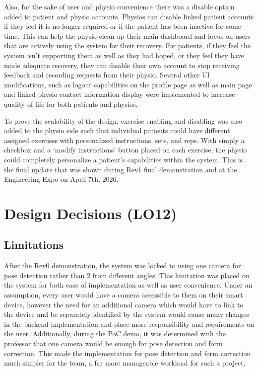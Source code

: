\documentclass{article}
\begin{document}
Also, for the sake of user and physio convenience there was a disable option added to patient and physio accounts. Physios can disable linked patient accounts if they feel it is no longer required or if the patient has been inactive for some time. This can help the physio clean up their main dashboard and focus on users that are actively using the system for their recovery. For patients, if they feel the system isn’t supporting them as well as they had hoped, or they feel they have made adequate recovery, they can disable their own account to stop receiving feedback and recording requests from their physio. Several other UI modifications, such as logout capabilities on the profile page as well as main page and linked physio contact information display were implemented to increase quality of life for both patients and physios.

To prove the scalability of the design, exercise enabling and disabling was also added to the physio side such that individual patients could have different assigned exercises with personalized instructions, sets, and reps. With simply a checkbox and a ‘modify instructions’ button placed on each exercise, the physio could completely personalize a patient’s capabilities within the system. This is the final update that was shown during Rev1 final demonstration and at the Engineering Expo on April 7th, 2026.

\section{Design Decisions (LO12)}

\subsection{Limitations}

After the Rev0 demonstration, the system was locked to using one camera for pose detection rather than 2 from different angles. This limitation was placed on the system for both ease of implementation as well as user convenience. Under an assumption, every user would have a camera accessible to them on their smart device, however the need for an additional camera which would have to link to the device and be separately identified by the system would cause many changes in the backend implementation and place more responsibility and requirements on the user. Additionally, during the PoC demo, it was determined with the professor that one camera would be enough for pose detection and form correction. This made the implementation for pose detection and form correction much simpler for the team, a far more manageable workload for such a project.
\end{document}
